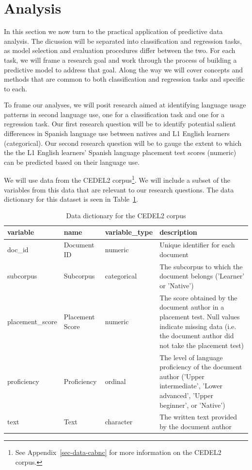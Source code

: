 \documentclass[
  letterpaper,
  DIV=11,
  numbers=noendperiod]{scrreprt}
\theoremstyle{definition}
\theoremstyle{remark}
\begin{document}
\section{Analysis}\label{sec-pda-analysis}

In this section we now turn to the practical application of predictive
data analysis. The dicussion will be separated into classification and
regression tasks, as model selection and evaluation procedures differ
between the two. For each task, we will frame a research goal and work
through the process of building a predictive model to address that goal.
Along the way we will cover concepts and methods that are common to both
classification and regression tasks and specific to each.

To frame our analyses, we will posit research aimed at identifying
language usage patterns in second language use, one for a classification
task and one for a regression task. Our first research question will be
to identify potential salient differences in Spanish language use
between natives and L1 English learners (categorical). Our second
research question will be to gauge the extent to which the the L1
English learners' Spanish language placement test scores (numeric) can
be predicted based on their language use.

We will use data from the CEDEL2 corpus\footnote{See
  Appendix~\ref{sec-data-cabnc} for more information on the CEDEL2
  corpus.}. We will include a subset of the variables from this data
that are relevant to our research questions. The data dictionary for
this dataset is seen in Table~\ref{tbl-pda-cedel2-data-dictionary}.

\begin{longtable}[t]{llll}

\caption{\label{tbl-pda-cedel2-data-dictionary}Data dictionary for the
CEDEL2 corpus}

\tabularnewline

\toprule
variable & name & variable\_type & description\\
\midrule
doc\_id & Document ID & numeric & Unique identifier for each document\\
subcorpus & Subcorpus & categorical & The subcorpus to which the document belongs ('Learner' or 'Native')\\
placement\_score & Placement Score & numeric & The score obtained by the document author in a placement test. Null values indicate missing data (i.e. the document author did not take the placement test)\\
proficiency & Proficiency & ordinal & The level of language proficiency of the document author ('Upper intermediate', 'Lower advanced', 'Upper beginner', or 'Native')\\
text & Text & character & The written text provided by the document author\\
\bottomrule

\end{longtable}
\end{document}
